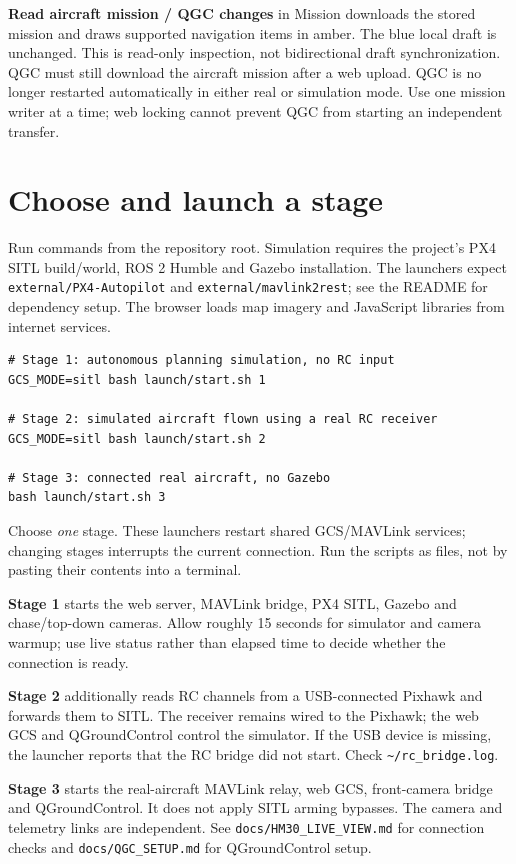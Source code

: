 \documentclass[11pt]{article}
\begin{document}
\textbf{Read aircraft mission / QGC changes} in Mission downloads the stored
mission and draws supported navigation items in amber. The blue local draft is
unchanged. This is read-only inspection, not bidirectional draft synchronization.
QGC must still download the aircraft mission after a web upload. QGC is no longer
restarted automatically in either real or simulation mode. Use one mission writer
at a time; web locking cannot prevent QGC from starting an independent transfer.

\section{Choose and launch a stage}
Run commands from the repository root. Simulation requires the project's PX4
SITL build/world, ROS 2 Humble and Gazebo installation. The launchers expect
\texttt{external/PX4-Autopilot} and \texttt{external/mavlink2rest}; see the README
for dependency setup. The browser loads map imagery and JavaScript libraries
from internet services.

\begin{lstlisting}
# Stage 1: autonomous planning simulation, no RC input
GCS_MODE=sitl bash launch/start.sh 1

# Stage 2: simulated aircraft flown using a real RC receiver
GCS_MODE=sitl bash launch/start.sh 2

# Stage 3: connected real aircraft, no Gazebo
bash launch/start.sh 3
\end{lstlisting}
Choose \emph{one} stage. These launchers restart shared GCS/MAVLink services;
changing stages interrupts the current connection. Run the scripts as files,
not by pasting their contents into a terminal.

\textbf{Stage 1} starts the web server, MAVLink bridge, PX4 SITL, Gazebo and
chase/top-down cameras. Allow roughly 15 seconds for simulator and camera warmup;
use live status rather than elapsed time to decide whether the connection is ready.

\textbf{Stage 2} additionally reads RC channels from a USB-connected Pixhawk and
forwards them to SITL. The receiver remains wired to the Pixhawk; the web GCS and
QGroundControl control the simulator. If the USB device is missing, the launcher
reports that the RC bridge did not start. Check \texttt{\textasciitilde/rc\_bridge.log}.

\textbf{Stage 3} starts the real-aircraft MAVLink relay, web GCS, front-camera
bridge and QGroundControl. It does not apply SITL arming bypasses. The camera and
telemetry links are independent. See \texttt{docs/HM30\_LIVE\_VIEW.md} for connection
checks and \texttt{docs/QGC\_SETUP.md} for QGroundControl setup.
\end{document}
